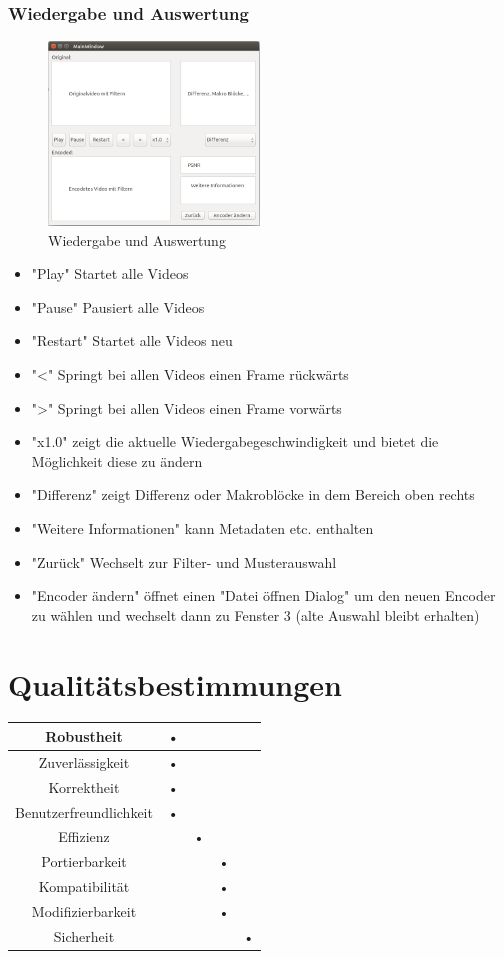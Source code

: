 \documentclass[parskip=full]{scrartcl}
\begin{document}
\subsubsection{Wiedergabe und Auswertung}
\begin{figure}[htbp]
\centering
\includegraphics[width=0.5\textwidth]{GUI_Entwurf_1/GUI_4.png}
\caption{Wiedergabe und Auswertung}
\end{figure}
\begin{itemize}
\item "Play" Startet alle Videos
\item "Pause" Pausiert alle Videos
\item "Restart" Startet alle Videos neu
\item "<" Springt bei allen Videos einen Frame rückwärts
\item ">" Springt bei allen Videos einen Frame vorwärts
\item "x1.0" zeigt die aktuelle Wiedergabegeschwindigkeit und bietet die Möglichkeit diese zu ändern
\item "Differenz" zeigt Differenz oder Makroblöcke in dem Bereich oben rechts
\item "Weitere Informationen" kann Metadaten etc. enthalten
\item "Zurück" Wechselt zur Filter- und Musterauswahl
\item "Encoder ändern" öffnet einen "Datei öffnen Dialog" um den neuen Encoder zu wählen und wechselt dann zu Fenster 3 (alte Auswahl bleibt erhalten)
\end{itemize}
\section{Qualitätsbestimmungen}
\begin{tabular}{|c|c|c|c|c|}
\hline Robustheit & • &  &  & \\ 
\hline Zuverlässigkeit & • &  &  & \\ 
\hline Korrektheit & • &  &  & \\ 
\hline Benutzerfreundlichkeit & • &  &  & \\ 
\hline Effizienz &  & • &  & \\ 
\hline Portierbarkeit &  &  & • & \\ 
\hline Kompatibilität &  &  & • & \\ 
\hline Modifizierbarkeit &  &  & • & \\ 
\hline Sicherheit &  &  &  & • \\ 
\hline 
\end{tabular} 
\end{document}
